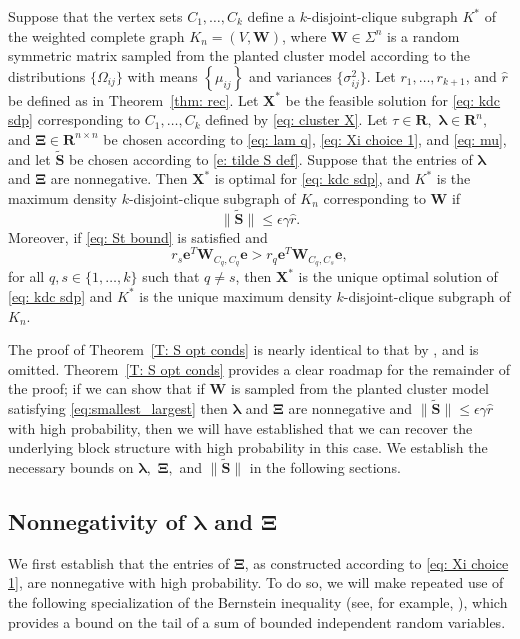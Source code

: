 \documentclass[twoside,11pt]{article}
\newcommand{\R}{\mathbf{R}}
\newcommand{\St}{\bs{\tilde S}}
\newcommand{\e}{\bs {e}}
\newcommand{\bs}{\boldsymbol}
\newcommand{\X}{\bs {X}}
\newcommand{\W}{\bs {W}}
\newcommand{\0}{\bs{0}}
\newcommand{\bra}[1]{\ensuremath{\left\{ #1 \right\}}} %
\begin{document}
{\begin{theorem} \label{T: S opt conds}
	Suppose that the vertex sets $C_1, \dots, C_k$ define a $k$-disjoint-clique subgraph $K^*$ of
	the weighted complete graph $K_n = (V, \W)$, where
	$\W \in \Sigma^n$ is a random symmetric matrix sampled from the planted cluster model
  according to the distributions \(\{\Omega_{ij}\}\) with means \( \bra{\mu_{ij}} \)
  and variances $\{\sigma^2_{ij}\}$.
	Let $r_1, \dots, r_{k+1}$, and  $\hat r$ be defined as in Theorem~\ref{thm: rec}.
	Let $\X^*$ be the feasible solution for \eqref{eq: kdc sdp} corresponding to $C_1, \dots, C_k$ defined
	by \eqref{eq: cluster X}. Let $\tau \in \R,$ $\bs\lambda \in \R^n,$  and $\bs\Xi \in \R^{n\times n}$
	be chosen according to \eqref{eq: lam q},  \eqref{eq: Xi choice 1},
	and \eqref{eq: mu},
	and let $\St$ be chosen according to \eqref{e: tilde S def}.
	Suppose that the entries of  $\bs\lambda$ and  $\bs\Xi$ are nonnegative.
	Then
	$\X^*$ is optimal for \eqref{eq: kdc sdp}, and $K^*$  is the maximum density
	$k$-disjoint-clique
	subgraph of $K_n$ corresponding to $\W$ if
	\begin{equation} \label{eq: St bound}
	\| \St\| \le  \epsilon \gamma \hat r.
	\end{equation}
	Moreover, if \eqref{eq: St bound} is satisfied and
	\begin{equation} \label{a: block weights}
	r_s \e^T \W_{C_q, C_q} \e > r_q \e^T \W_{C_q, C_s} \e,
	\end{equation}
	for all $q, s \in \{1,\dots,k\}$ such that $q\neq s$,
	then $\X^*$ is the unique optimal solution of \eqref{eq: kdc sdp} and
	$K^*$ is the unique maximum density $k$-disjoint-clique
	subgraph of $K_n$.
\end{theorem}

The proof of Theorem~\ref{T: S opt conds} is nearly identical to that by \citet[Theorem~4.2]{ames2014guaranteed}, and is
omitted.
Theorem~\ref{T: S opt conds} provides a clear roadmap for the remainder of the proof; if we can show that if \(\W\) is sampled from the planted cluster
model satisfying \eqref{eq:smallest_largest} then \(\bs \lambda\)
and \(\bs \Xi\) are nonnegative and \(\|\St\| \le \epsilon \gamma \hat r\) with high probability, then we will have established that we can recover the underlying block
structure with high probability in this case. We establish the necessary bounds on \(\bs \lambda,\) \(\bs \Xi,\) and \(\|\St\|\)
in the following sections.

\subsection{Nonnegativity of \(\bs\lambda\) and \(\bs\Xi\)}
\label{sec: nonneg}
We first establish that the entries of \(\bs \Xi\), as constructed according to \eqref{eq: Xi choice 1},
are nonnegative with high probability.
To do so, we will make repeated use of the following specialization of the
Bernstein inequality (see, for example,
\citet[Theorem~6]{lugosi2009}),
which provides a  bound on the tail of a sum of bounded independent random variables.

}
\end{document}

